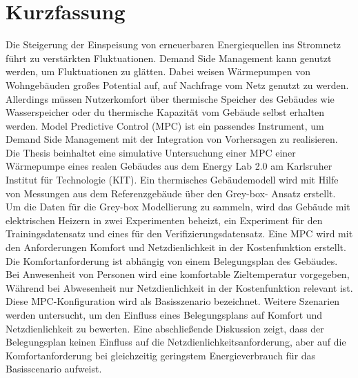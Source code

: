 \chapter{Kurzfassung}
\label{ch:kurzfassung}
Die Steigerung der Einspeisung von erneuerbaren Energiequellen ins Stromnetz führt zu verstärkten Fluktuationen. Demand Side Management kann genutzt werden, um Fluktuationen zu glätten. Dabei weisen Wärmepumpen von Wohngebäuden großes Potential auf, auf Nachfrage vom Netz genutzt zu werden. Allerdings müssen Nutzerkomfort über thermische Speicher des Gebäudes wie Wasserspeicher oder du thermische Kapazität vom Gebäude selbst erhalten werden. Model Predictive Control (MPC) ist ein passendes Instrument, um Demand Side Management mit der Integration von Vorhersagen zu realisieren.\newline 
Die Thesis beinhaltet eine simulative Untersuchung einer MPC einer Wärmepumpe eines realen Gebäudes aus dem Energy Lab 2.0 am Karlsruher Institut für Technologie (KIT). Ein thermisches Gebäudemodell wird mit Hilfe von Messungen aus dem Referenzgebäude über den Grey-box- Ansatz erstellt. Um die Daten für die Grey-box Modellierung zu sammeln, wird das Gebäude mit elektrischen Heizern in zwei Experimenten beheizt, ein Experiment für den Trainingsdatensatz und eines für den Verifizierungsdatensatz.\newline
Eine MPC wird mit den Anforderungen Komfort und Netzdienlichkeit in der Kostenfunktion erstellt. Die Komfortanforderung ist abhängig von einem Belegungsplan des Gebäudes. Bei Anwesenheit von Personen wird eine komfortable Zieltemperatur vorgegeben, Während bei Abwesenheit nur Netzdienlichkeit in der Kostenfunktion relevant ist. Diese MPC-Konfiguration wird als Basisszenario bezeichnet.  Weitere Szenarien werden untersucht, um den Einfluss eines Belegungsplans auf Komfort und Netzdienlichkeit zu bewerten. Eine abschließende Diskussion zeigt, dass der Belegungsplan keinen Einfluss auf die Netzdienlichkeitsanforderung, aber auf die Komfortanforderung bei gleichzeitig geringstem Energieverbrauch für das Basisscenario aufweist.



